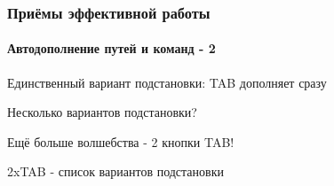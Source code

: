 \begin{frame}
  \frametitle{Приёмы эффективной работы}
  \framesubtitle{Автодополнение путей и команд - 2}
  
  \Large{\alert{Единственный вариант подстановки}: \newline TAB дополняет сразу} \pause

  \Large{\alert{Несколько вариантов подстановки?}} 

  \Large{Ещё больше волшебства - 2 кнопки TAB!} 

  \Large{\alert{2xTAB - список вариантов подстановки}}
\end{frame}
